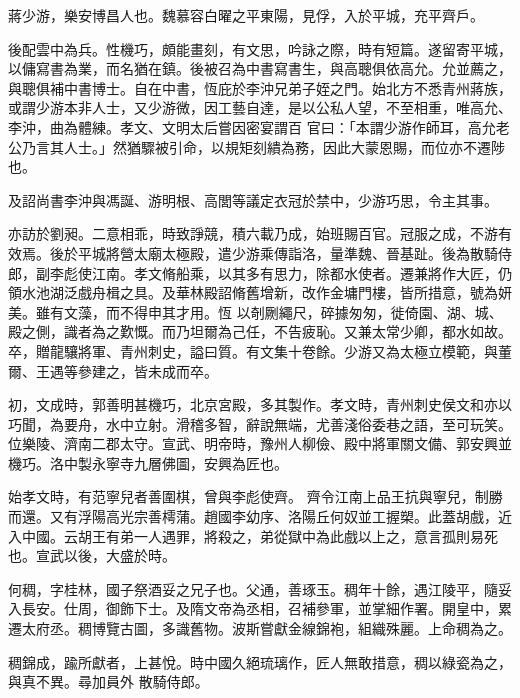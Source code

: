 \begin{pinyinscope}
 蔣少游，樂安博昌人也。魏慕容白曜之平東陽，見俘，入於平城，充平齊戶。



 後配雲中為兵。性機巧，頗能畫刻，有文思，吟詠之際，時有短篇。遂留寄平城，以傭寫書為業，而名猶在鎮。後被召為中書寫書生，與高聰俱依高允。允並薦之，與聰俱補中書博士。自在中書，恆庇於李沖兄弟子姪之門。始北方不悉青州蔣族，或謂少游本非人士，又少游微，因工藝自達，是以公私人望，不至相重，唯高允、李沖，曲為體練。孝文、文明太后嘗因密宴謂百
 官曰：「本謂少游作師耳，高允老公乃言其人士。」然猶驟被引命，以規矩刻繢為務，因此大蒙恩賜，而位亦不遷陟也。



 及詔尚書李沖與馮誕、游明根、高閭等議定衣冠於禁中，少游巧思，令主其事。



 亦訪於劉昶。二意相乖，時致諍競，積六載乃成，始班賜百官。冠服之成，不游有效焉。後於平城將營太廟太極殿，遣少游乘傳詣洛，量準魏、晉基趾。後為散騎侍郎，副李彪使江南。孝文脩船乘，以其多有思力，除都水使者。遷兼將作大匠，仍領水池湖泛戲舟楫之具。及華林殿詔脩舊增新，改作金墉門樓，皆所措意，號為妍美。雖有文藻，而不得申其才用。恆
 以剞劂繩尺，碎據匆匆，徙倚園、湖、城、殿之側，識者為之歎慨。而乃坦爾為己任，不告疲恥。又兼太常少卿，都水如故。卒，贈龍驤將軍、青州刺史，謚曰質。有文集十卷餘。少游又為太極立模範，與董爾、王遇等參建之，皆未成而卒。



 初，文成時，郭善明甚機巧，北京宮殿，多其製作。孝文時，青州刺史侯文和亦以巧聞，為要舟，水中立射。滑稽多智，辭說無端，尤善淺俗委巷之語，至可玩笑。位樂陵、濟南二郡太守。宣武、明帝時，豫州人柳儉、殿中將軍關文備、郭安興並機巧。洛中製永寧寺九層佛圖，安興為匠也。



 始孝文時，有范寧兒者善圍棋，曾與李彪使齊。
 齊令江南上品王抗與寧兒，制勝而還。又有浮陽高光宗善樗蒲。趙國李幼序、洛陽丘何奴並工握槊。此蓋胡戲，近入中國。云胡王有弟一人遇罪，將殺之，弟從獄中為此戲以上之，意言孤則易死也。宣武以後，大盛於時。



 何稠，字桂林，國子祭酒妥之兄子也。父通，善琢玉。稠年十餘，遇江陵平，隨妥入長安。仕周，御飾下士。及隋文帝為丞相，召補參軍，並掌細作署。開皇中，累遷太府丞。稠博覽古圖，多識舊物。波斯嘗獻金線錦袍，組織殊麗。上命稠為之。



 稠錦成，踰所獻者，上甚悅。時中國久絕琉璃作，匠人無敢措意，稠以綠瓷為之，與真不異。尋加員外
 散騎侍郎。




\end{pinyinscope}
